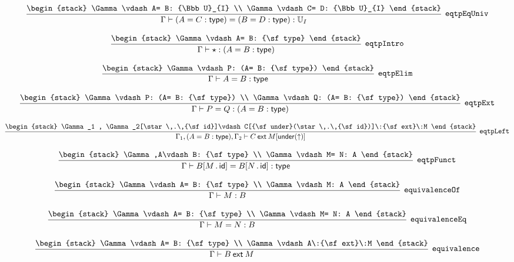 \[
\infer[{\tt eqtpEqUniv}]{\Gamma \vdash (A= C: {\sf type})= (B= D: {\sf type}): {\Bbb U}_{I}}{
\begin{stack}
\Gamma \vdash A= B: {\Bbb U}_{I}
\\
\Gamma \vdash C= D: {\Bbb U}_{I}
\end{stack}}
\]

\[
\infer[{\tt eqtpIntro}]{\Gamma \vdash \star : (A= B: {\sf type})}{
\begin{stack}
\Gamma \vdash A= B: {\sf type}
\end{stack}}
\]

\[
\infer[{\tt eqtpElim}]{\Gamma \vdash A= B: {\sf type}}{
\begin{stack}
\Gamma \vdash P: (A= B: {\sf type})
\end{stack}}
\]

\[
\infer[{\tt eqtpExt}]{\Gamma \vdash P= Q: (A= B: {\sf type})}{
\begin{stack}
\Gamma \vdash P: (A= B: {\sf type})
\\
\Gamma \vdash Q: (A= B: {\sf type})
\end{stack}}
\]

\[
\infer[{\tt eqtpLeft}]{\Gamma_1 ,(A= B: {\sf type}), \Gamma_2 \vdash C\:{\sf ext}\:M[{\sf under}(\uparrow )]}{
\begin{stack}
\Gamma_1 , \Gamma_2[\star \,.\,{\sf id}]\vdash C[{\sf under}(\star \,.\,{\sf id})]\:{\sf ext}\:M
\end{stack}}
\]

\[
\infer[{\tt eqtpFunct}]{\Gamma \vdash B[M\,.\,{\sf id}]= B[N\,.\,{\sf id}]: {\sf type}}{
\begin{stack}
\Gamma ,A\vdash B: {\sf type}
\\
\Gamma \vdash M= N: A
\end{stack}}
\]

\[
\infer[{\tt equivalenceOf}]{\Gamma \vdash M: B}{
\begin{stack}
\Gamma \vdash A= B: {\sf type}
\\
\Gamma \vdash M: A
\end{stack}}
\]

\[
\infer[{\tt equivalenceEq}]{\Gamma \vdash M= N: B}{
\begin{stack}
\Gamma \vdash A= B: {\sf type}
\\
\Gamma \vdash M= N: A
\end{stack}}
\]

\[
\infer[{\tt equivalence}]{\Gamma \vdash B\:{\sf ext}\:M}{
\begin{stack}
\Gamma \vdash A= B: {\sf type}
\\
\Gamma \vdash A\:{\sf ext}\:M
\end{stack}}
\]

